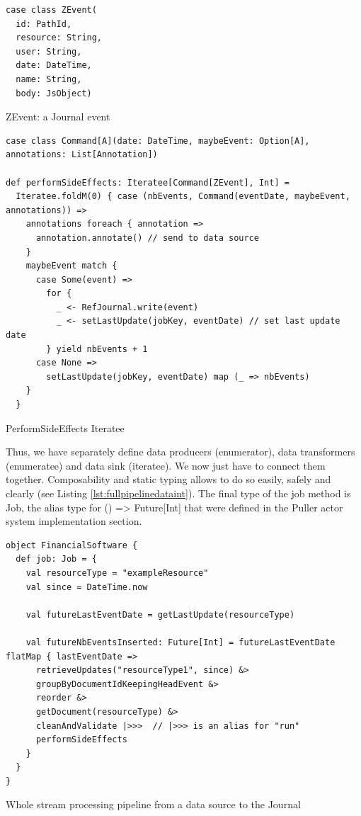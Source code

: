 \begin{listing}[h]
\begin{verbatim}
case class ZEvent(
  id: PathId,
  resource: String,
  user: String,
  date: DateTime,
  name: String,
  body: JsObject)
\end{verbatim}
\caption{ZEvent: a Journal event}
\label{lst:zevent}
\end{listing}

\begin{listing}[h]
\begin{verbatim}
case class Command[A](date: DateTime, maybeEvent: Option[A], annotations: List[Annotation]) 

def performSideEffects: Iteratee[Command[ZEvent], Int] =
  Iteratee.foldM(0) { case (nbEvents, Command(eventDate, maybeEvent, annotations)) =>
    annotations foreach { annotation =>
      annotation.annotate() // send to data source
    }
    maybeEvent match {
      case Some(event) =>
        for {
          _ <- RefJournal.write(event)
          _ <- setLastUpdate(jobKey, eventDate) // set last update date
        } yield nbEvents + 1
      case None =>
        setLastUpdate(jobKey, eventDate) map (_ => nbEvents)
    }
  }
\end{verbatim}
\caption{PerformSideEffects Iteratee}
\label{lst:finaliterateedataint}
\end{listing}

Thus, we have separately define data producers (enumerator), data transformers (enumeratee) and data sink (iteratee). We now just have to connect them together. Composability
and static typing allows to do so easily, safely and clearly (see Listing \ref{lst:fullpipelinedataint}). The final type of the job method is Job, the alias type for
() => Future[Int] that were defined in the Puller actor system implementation section.

\begin{listing}[h]
\begin{verbatim}
object FinancialSoftware {
  def job: Job = {
    val resourceType = "exampleResource"
    val since = DateTime.now

    val futureLastEventDate = getLastUpdate(resourceType)

    val futureNbEventsInserted: Future[Int] = futureLastEventDate flatMap { lastEventDate =>
      retrieveUpdates("resourceType1", since) &>
      groupByDocumentIdKeepingHeadEvent &>
      reorder &>
      getDocument(resourceType) &>
      cleanAndValidate |>>>  // |>>> is an alias for "run"
      performSideEffects
    }
  }
}

\end{verbatim}
\caption{Whole stream processing pipeline from a data source to the Journal}
\label{lst:fullpipelinedataint}
\end{listing}


